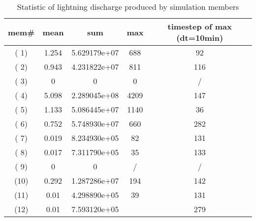 \begin{table}[H]
\centering
\caption{Statistic of lightning discharge produced by simulation members}
\begin{tabular}{|c|c|c|c|c|}
\hline
mem\# & mean  & sum          & max  & timestep of max (dt=10min) \\ \hline
( 1)  & 1.254 & 5.629179e+07 & 688  & 92                         \\ \hline
( 2)  & 0.943 & 4.231822e+07 & 811  & 116                        \\ \hline
( 3)  & 0     & 0            & 0    & /                          \\ \hline
( 4)  & 5.098 & 2.289045e+08 & 4209 & 147                        \\ \hline
( 5)  & 1.133 & 5.086445e+07 & 1140 & 36                         \\ \hline
( 6)  & 0.752 & 5.748930e+07 & 660  & 282                        \\ \hline
( 7)  & 0.019 & 8.234930e+05 & 82   & 131                        \\ \hline
( 8)  & 0.017 & 7.311790e+05 & 35   & 133                        \\ \hline
( 9)  & 0     & 0            & /    & /                          \\ \hline
(10)  & 0.292 & 1.287286e+07 & 194  & 142                        \\ \hline
(11)  & 0.01  & 4.298890e+05 & 39   & 131                        \\ \hline
(12)  & 0.01  & 7.593120e+05 &      & 279                        \\ \hline
\end{tabular}
\label{table:lgt_stat}
\end{table}
